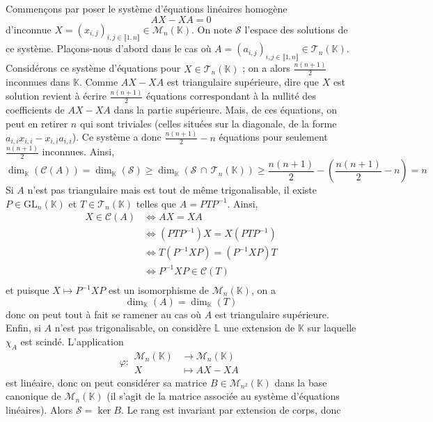 	\begin{demonstration}
		Commençons par poser le système d'équations linéaires homogène
		\[ AX - XA = 0 \]
		d'inconnue $X = (x_{i,j})_{i,j \in \llbracket 1, n \rrbracket} \in \mathcal{M}_n(\mathbb{K})$. On note $\mathcal{S}$ l'espace des solutions de ce système.
		\newpar
		Plaçons-nous d'abord dans le cas où $A = (a_{i,j})_{i,j \in \llbracket 1, n \rrbracket} \in \mathcal{T}_n(\mathbb{K})$. Considérons ce système d'équations pour $X \in \mathcal{T}_n(\mathbb{K})$ ; on a alors $\frac{n(n+1)}{2}$ inconnues dans $\mathbb{K}$. Comme $AX-XA$ est triangulaire supérieure, dire que $X$ est solution revient à écrire $\frac{n(n+1)}{2}$ équations correspondant à la nullité des coefficients de $AX - XA$ dans la partie supérieure. Mais, de ces équations, on peut en retirer $n$ qui sont triviales (celles situées sur la diagonale, de la forme $a_{i,i} x_{i,i} - x_{i,i} a_{i,i}$). Ce système a donc $\frac{n(n+1)}{2} - n$ équations pour seulement $\frac{n(n+1)}{2}$ inconnues. Ainsi,
		\[ \dim_{\mathbb{K}}(\mathcal{C}(A)) = \dim_{\mathbb{K}}(\mathcal{S}) \geq \dim_{\mathbb{K}}(\mathcal{S} \, \cap \, \mathcal{T}_n(\mathbb{K})) \geq \frac{n(n+1)}{2} - \left( \frac{n(n+1)}{2} - n \right) = n \]
		Si $A$ n'est pas triangulaire mais est tout de même trigonalisable, il existe $P \in \mathrm{GL}_n(\mathbb{K})$ et $T \in \mathcal{T}_n(\mathbb{K})$ telles que $A = PTP^{-1}$. Ainsi,
		\begin{align*}
			X \in \mathcal{C}(A) &\iff AX = XA \\
			&\iff (PTP^{-1}) X = X (PTP^{-1}) \\
			&\iff T (P^{-1}XP) = (P^{-1}XP) T \\
			&\iff P^{-1}XP \in \mathcal{C}(T) \\
		\end{align*}
		et puisque $X \mapsto P^{-1}XP$ est un isomorphisme de $\mathcal{M}_n(\mathbb{K})$, on a
		\[ \dim_{\mathbb{K}}(A) = \dim_{\mathbb{K}}(T) \]
		donc on peut tout à fait se ramener au cas où $A$ est triangulaire supérieure.
		\newpar
		Enfin, si $A$ n'est pas trigonalisable, on considère $\mathbb{L}$ une extension de $\mathbb{K}$ sur laquelle $\chi_A$ est scindé. L'application
		\[ \varphi :
		\begin{array}{cl}
			\mathcal{M}_n(\mathbb{K}) &\rightarrow \mathcal{M}_n(\mathbb{K}) \\
			X &\mapsto AX-XA
		\end{array}
		\]
		est linéaire, donc on peut considérer sa matrice $B \in \mathcal{M}_{n^2}(\mathbb{K})$ dans la base canonique de $\mathcal{M}_n(\mathbb{K})$ (il s'agit de la matrice associée au système d'équations linéaires). Alors $\mathcal{S} = \ker{B}$. Le rang est invariant par extension de corps, donc

\end{demonstration}
